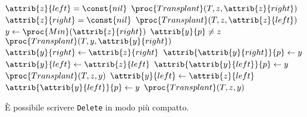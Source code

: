  

\begin{codebox}
	\li \If $\attrib{z}{left} = \const{nil}$
	\li \Then
			$\proc{Transplant}(T,z,\attrib{z}{right})$
	\li \Else \If $\attrib{z}{right} = \const{nil}$
	\li     $\proc{Transplant}(T,z,\attrib{z}{left})$
	\li \Else
	\li     $y \gets \proc{Min}(\attrib{z}{right})$
	\li     \If $\attrib{y}{p} \neq z$
	\li     \Then
				$\proc{Transplant}(T, y, \attrib{y}{right})$
	\li         $\attrib{y}{right} \gets \attrib{z}{right}$
	\li         $\attrib{\attrib{y}{right}}{p} \gets y$
	\li         $\attrib{y}{left} \gets \attrib{z}{left}$
	\li         $\attrib{\attrib{y}{left}}{p} \gets y$
	\li         $\proc{Transplant}(T,z,y)$
	\li     \Else
	\li         $\attrib{y}{left} \gets \attrib{z}{left}$
	\li         $\attrib{\attrib{y}{left}}{p} \gets y$
	\li         $\proc{Transplant}(T,z,y)$
			\End
		\End
\end{codebox}
È possibile scrivere \texttt{Delete} in modo più compatto.

